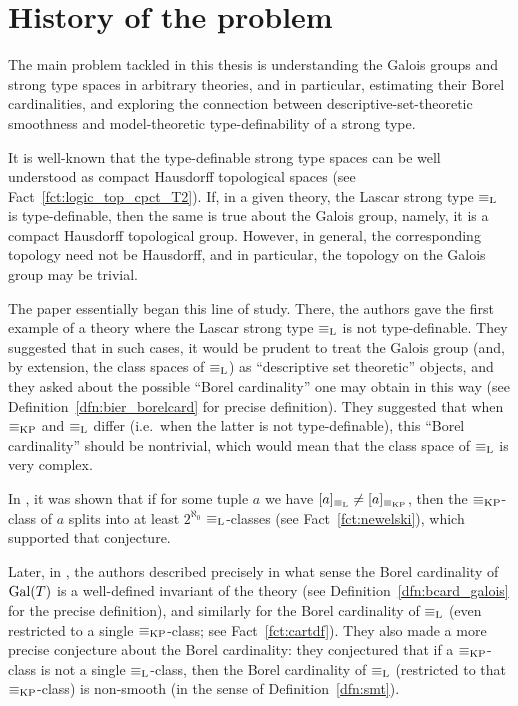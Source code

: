 	\section{History of the problem}
	The main problem tackled in this thesis is understanding the Galois groups and strong type spaces in arbitrary theories, and in particular, estimating their Borel cardinalities, and exploring the connection between descriptive-set-theoretic smoothness and model-theoretic type-definability of a strong type.
	
	It is well-known that the type-definable strong type spaces can be well understood as compact Hausdorff topological spaces (see Fact~\ref{fct:logic_top_cpct_T2}). If, in a given theory, the Lascar strong type $\equiv_{\mathrm{L}}$ is type-definable, then the same is true about the Galois group, namely, it is a compact Hausdorff topological group. However, in general, the corresponding topology need not be Hausdorff, and in particular, the topology on the Galois group may be trivial.
	
	The paper \cite{CLPZ01} essentially began this line of study. There, the authors gave the first example of a theory where the Lascar strong type $\equiv_{\mathrm{L}}$ is not type-definable. They suggested that in such cases, it would be prudent to treat the Galois group (and, by extension, the class spaces of $\equiv_{\mathrm{L}}$) as ``descriptive set theoretic'' objects, and they asked about the possible ``Borel cardinality'' one may obtain in this way (see Definition~\ref{dfn:bier_borelcard} for precise definition). They suggested that when $\equiv_{\mathrm{KP}}$ and $\equiv_{\mathrm{L}}$ differ (i.e.\ when the latter is not type-definable), this ``Borel cardinality'' should be nontrivial, which would mean that the class space of $\equiv_{\mathrm{L}}$ is very complex.
	
	In \cite{Ne03}, it was shown that if for some tuple $a$ we have $[a]_{\equiv_{\mathrm{L}}}\neq [a]_{\equiv_{\mathrm{KP}}}$, then the $\equiv_{\mathrm{KP}}$-class of $a$ splits into at least $2^{\aleph_0}$ $\equiv_{\mathrm{L}}$-classes (see Fact~\ref{fct:newelski}), which supported that conjecture.
	
	Later, in \cite{KPS13}, the authors described precisely in what sense the Borel cardinality of $\operatorname{{Gal}}(T)$ is a well-defined invariant of the theory (see Definition~\ref{dfn:bcard_galois} for the precise definition), and similarly for the Borel cardinality of $\equiv_{\mathrm{L}}$ (even restricted to a single $\equiv_{\mathrm{KP}}$-class; see Fact~\ref{fct:cartdf}). They also made a more precise conjecture about the Borel cardinality: they conjectured that if a $\equiv_{\mathrm{KP}}$-class is not a single $\equiv_{\mathrm{L}}$-class, then the Borel cardinality of $\equiv_{\mathrm{L}}$ (restricted to that $\equiv_{\mathrm{KP}}$-class) is non-smooth (in the sense of Definition~\ref{dfn:smt}).
	
